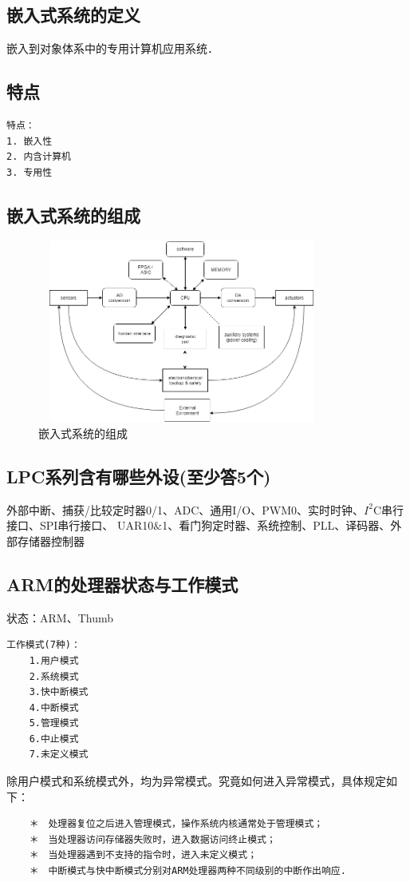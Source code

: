 \documentclass[cn,11pt]{elegantbook}
\begin{document}
\subsection{嵌入式系统的定义}
嵌入到对象体系中的专用计算机应用系统．
\subsection{特点}
\begin{lstlisting}
特点：
1. 嵌入性
2. 内含计算机 
3. 专用性
\end{lstlisting}


\subsection{嵌入式系统的组成}
	\begin{figure}[htbp]
	\centering
	\includegraphics[height=6.0cm,width=9.5cm]{image/qianrushizucheng.png}%
	\caption{嵌入式系统的组成}
\end{figure}
\subsection{LPC系列含有哪些外设(至少答5个)}
外部中断、捕获/比较定时器0/1、ADC、通用I/O、PWM0、实时时钟、$I^2$C串行接口、SPI串行接口、
UAR10$\&$1、看门狗定时器、系统控制、PLL、译码器、外部存储器控制器

\subsection{ARM的处理器状态与工作模式}
状态：ARM、Thumb
\begin{lstlisting}
工作模式(7种)：
	1.用户模式
	2.系统模式
	3.快中断模式
	4.中断模式
	5.管理模式
	6.中止模式
	7.未定义模式
\end{lstlisting}
除用户模式和系统模式外，均为异常模式。究竟如何进入异常模式，具体规定如下：
\begin{lstlisting}
	＊　处理器复位之后进入管理模式，操作系统内核通常处于管理模式；
	＊　当处理器访问存储器失败时，进入数据访问终止模式；
	＊　当处理器遇到不支持的指令时，进入未定义模式；
	＊　中断模式与快中断模式分别对ARM处理器两种不同级别的中断作出响应.
\end{lstlisting}
\end{document}
